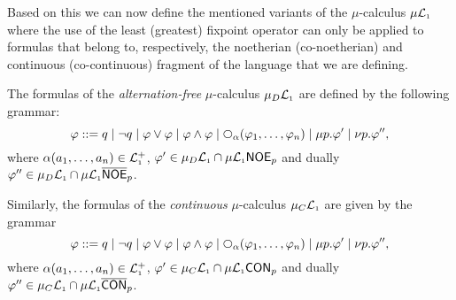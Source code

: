 Based on this we can now define the mentioned variants 
of the $\mu$-calculus $\mu\mathcal{L}_{\scriptscriptstyle 1}$ where the use of the least (greatest) 
fixpoint operator can only be applied to formulas that belong to, 
respectively, the noetherian (co-noetherian) and continuous (co-continuous)
fragment of the language that we are defining.

\begin{definition}
The formulas of the \emph{alternation-free} $\mu$-calculus $\mu_{D}\mathcal{L}_{\scriptscriptstyle 1}$ 
are defined by the following grammar:
\begin{equation*}
   \varphi ::= 
      q \mid \neg q 
   \mid \varphi\lor\varphi \mid \varphi\land\varphi 
   \mid \nxt{\al}(\varphi_{1},\ldots,\varphi_{n})
   \mid \mu p. \varphi'    
   \mid \nu p. \varphi'',
\end{equation*} 
where $\alpha(a_{1},\ldots,a_{n}) \in \mathcal{L}_{\scriptscriptstyle 1}^{+}$,
$\varphi' \in \mu_{D}\mathcal{L}_{\scriptscriptstyle 1} \cap \mu\mathcal{L}_{\scriptscriptstyle 1}\mathsf{NOE}_{p}$
and dually $\varphi'' \in \mu_{D}\mathcal{L}_{\scriptscriptstyle 1} \cap \mu\mathcal{L}_{\scriptscriptstyle 1}\overline{\mathsf{NOE}}_{p}$.

Similarly, the formulas of the \emph{continuous} $\mu$-calculus $\mu_{C}\mathcal{L}_{\scriptscriptstyle 1}$
are given by the grammar
\begin{equation*}
   \varphi ::= 
      q \mid \neg q 
   \mid \varphi\lor\varphi \mid \varphi\land\varphi 
   \mid \nxt{\al}(\varphi_{1},\ldots,\varphi_{n})
   \mid \mu p. \varphi'    
   \mid \nu p. \varphi'',
\end{equation*} 
where $\alpha(a_{1},\ldots,a_{n}) \in \mathcal{L}_{\scriptscriptstyle 1}^{+}$,
$\varphi' \in \mu_{C}\mathcal{L}_{\scriptscriptstyle 1} \cap \mu\mathcal{L}_{\scriptscriptstyle 1}\mathsf{CON}_{p}$
and dually $\varphi'' \in \mu_{C}\mathcal{L}_{\scriptscriptstyle 1} \cap \mu\mathcal{L}_{\scriptscriptstyle 1}\overline{\mathsf{CON}}_{p}$.
\end{definition}



